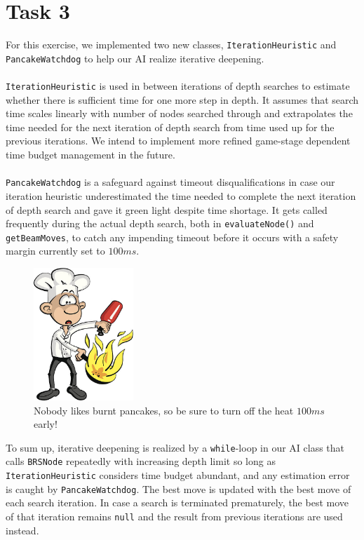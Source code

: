 \documentclass[a4paper,12pt]{article}
\begin{document}
\newpage

\section{Task 3}
For this exercise, we implemented two new classes, \texttt{IterationHeuristic} and \texttt{PancakeWatchdog} to help our AI realize iterative deepening.
\\ \\
\texttt{IterationHeuristic} is used in between iterations of depth searches to estimate whether there is sufficient time for one more step in depth. It assumes that search time scales linearly with number of nodes searched through and extrapolates the time needed for the next iteration of depth search from time used up for the previous iterations. We intend to implement more refined game-stage dependent time budget management in the future.
\\ \\
\texttt{PancakeWatchdog} is a safeguard against timeout disqualifications in case our iteration heuristic underestimated the time needed to complete the next iteration of depth search and gave it green light despite time shortage. It gets called frequently during the actual depth search, both in \texttt{evaluateNode()} and \texttt{getBeamMoves}, to catch any impending timeout before it occurs with a safety margin currently set to $100 ms$.

\begin{figure}[H]
    \centering
    \includegraphics[height=5cm]{pictures/assignment4/burned_pancake.jpg}
    \caption*{Nobody likes burnt pancakes, so be sure to turn off the heat $100ms$ early!}
    \label{fig:burned_pancake}
\end{figure}

To sum up, iterative deepening is realized by a \texttt{while}-loop in our AI class that calls \texttt{BRSNode} repeatedly with increasing depth limit so long as \texttt{IterationHeuristic} considers time budget abundant, and any estimation error is caught by \texttt{PancakeWatchdog}. The best move is updated with the best move of each search iteration. In case a search is terminated prematurely, the best move of that iteration remains \texttt{null} and the result from previous iterations are used instead.
\end{document}

